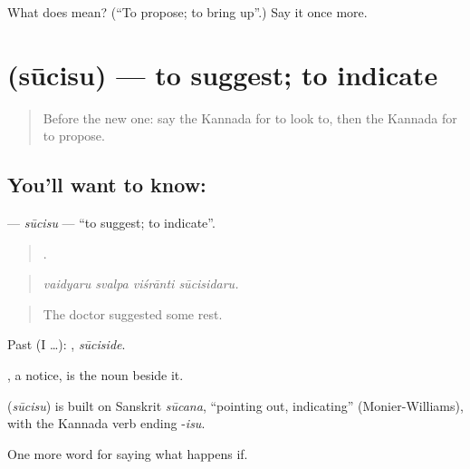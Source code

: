 \begin{tcolorbox}[breakable,colback=teal!4,colframe=teal!35!black,title={Before you move on}]
What does  mean? (\textquotedblleft{}To propose; to bring up\textquotedblright{}.) Say it once more.
\end{tcolorbox}
\section[\texorpdfstring{\kn{ಸೂಚಿಸು} (sūcisu)}{ಸೂಚಿಸು (sūcisu)}]{ (sūcisu) — to suggest; to indicate}

\label{lesson:KA-C429-sucisu}



\begin{quote}
Before the new one: say the Kannada for to look to, then the Kannada for to propose.
\end{quote}

\subsection*{You'll want to know: }
\textbf{} — \emph{sūcisu} — \textquotedblleft{}to suggest; to indicate\textquotedblright{}.

\begin{quote}
   .
\end{quote}

\begin{quote}
\emph{vaidyaru svalpa viśrānti sūcisidaru.}
\end{quote}

\begin{quote}
The doctor suggested some rest.
\end{quote}

Past (I …): , \emph{sūciside}.

, a notice, is the noun beside it.

\begin{cousinweb}
\textbf{} (\emph{sūcisu}) is built on Sanskrit \emph{sūcana}, \textquotedblleft{}pointing out, indicating\textquotedblright{} (Monier-Williams), with the Kannada verb ending -\emph{isu}.
\end{cousinweb}

\begin{grammarlens}[title={What you've built}]
One more word for saying what happens if.
\end{grammarlens}

